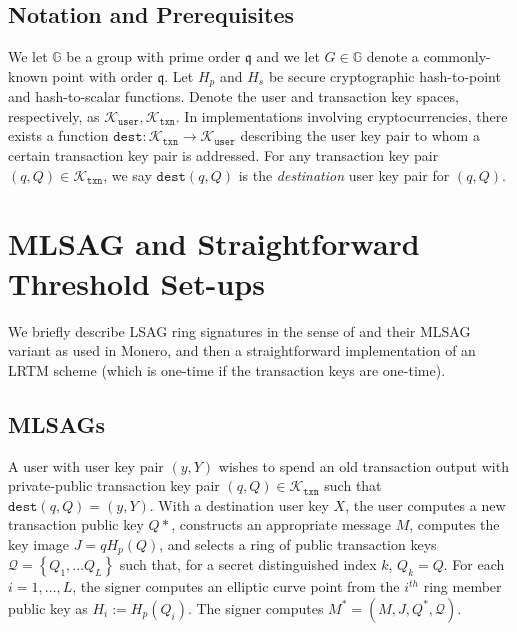 \documentclass{mrl}
\theoremstyle{definition}
\begin{document}
\subsection{Notation and Prerequisites}

We let $\mathbb{G}$ be a group with prime order $\mathfrak{q}$ and we let $G \in \mathbb{G}$ denote a commonly-known point with order $\mathfrak{q}$. Let $H_p$ and $H_s$ be secure cryptographic hash-to-point and hash-to-scalar functions. Denote the user and transaction key spaces, respectively, as $\mathcal{K}_{\texttt{user}}, \mathcal{K}_{\texttt{txn}}$. In implementations involving cryptocurrencies, there exists a function $\texttt{dest}:\mathcal{K}_{\texttt{txn}} \to \mathcal{K}_{\texttt{user}}$ describing the user key pair to whom a certain transaction key pair is addressed. For any transaction key pair $(q,Q) \in \mathcal{K}_{\texttt{txn}}$, we say $\texttt{dest}(q,Q)$ is the \textit{destination} user key pair for $(q,Q)$. %


\section{MLSAG and Straightforward Threshold Set-ups}


We briefly describe LSAG ring signatures in the sense of \cite{liu2004linkable} and their MLSAG variant as used in Monero, and then a straightforward implementation of an LRTM scheme (which is one-time if the transaction keys are one-time). 

\subsection{MLSAGs}

A user with user key pair $(y,Y)$ wishes to spend an old transaction output with private-public transaction key pair $(q,Q) \in \mathcal{K}_{\texttt{txn}}$ such that $\texttt{dest}(q,Q) = (y,Y)$. With a destination user key $X$, the user computes a new transaction public key $Q*$, constructs an appropriate message $M$, computes the key image $J = qH_p(Q)$, and selects a ring of public transaction keys $\mathcal{Q}=\left\{Q_1, \ldots Q_L\right\}$ such that, for a secret distinguished index $k$, $Q_{k}=Q$. For each $i=1,\ldots,L$, the signer computes an elliptic curve point from the $i^{th}$ ring member public key  as $H_i := H_{p}(Q_i)$. The signer computes $M^* = (M, J, Q^*, \mathcal{Q})$.
\end{document}
